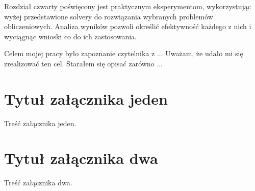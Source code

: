 \documentclass[xodstep]{wnspt}
\begin{document}
Rozdział czwarty poświęcony jest praktycznym eksperymentom, wykorzystując wyżej przedstawione solvery do rozwiązania wybranych problemów obliczeniowych. Analiza wyników pozwoli określić efektywność każdego z nich i wyciągnąc wnioski co do ich zastosowania.







\summary
Celem mojej pracy było zapoznanie czytelnika z ... 
Uważam, że udało mi się zrealizować ten cel. Starałem się opisać zarówno ...

\appendix
\chapter{Tytuł załącznika jeden}
Treść załącznika jeden.

\chapter{Tytuł załącznika dwa}
Treść załącznika dwa.

%
%

\printbibliography[type=article,title={Bibliografia - artykuły}]

\printbibliography[type=book,title={Bibliografia - książki}]

\listoftables

\listoffigures

\lstlistoflistings
\end{document}
